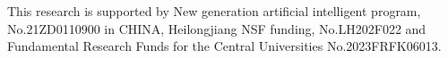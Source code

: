 \documentclass[acmsmall,manuscript, screen, review]{acmart}
\begin{document}
\begin{acks}
  This research is supported by New generation artificial intelligent program, No.21ZD0110900 in CHINA, Heilongjiang NSF funding, No.LH202F022 and 
  Fundamental Research Funds for the Central Universities No.2023FRFK06013.
\end{acks}





\appendix
\end{document}
